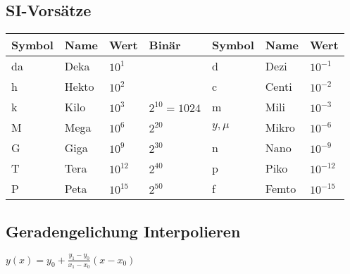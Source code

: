 \subsection{SI-Vorsätze}
\renewcommand{\arraystretch}{1.2}
\begin{tabularx}{\textwidth}{|X|X|X|X|X|X|l|}
	\hline
\textbf{Symbol}	&\textbf{Name}  &\textbf{Wert}  &\textbf{Binär}  &\textbf{Symbol}  &\textbf{Name}  &\textbf{Wert}
 \\ \hline 
da	& Deka    &$ 10^1 $   &    			     & d          & Dezi   &$ 10^{-1} $ 
\\ \hline
h	&Hekto    &$ 10^2 $   &                  & c          & Centi  &$ 10^{-2} $ 
\\ \hline
k	&Kilo     &$ 10^3 $   &$ 2^{10}=1024  $  & m          & Mili   &$ 10^{-3} $ 
\\ \hline
M	& Mega    &$ 10^6 $   &$ 2^20 $          &$ y, \mu $  & Mikro  &$ 10^{-6} $
\\ \hline
G   &Giga     &$ 10^9 $   &$ 2^30 $          & n          & Nano   &$ 10^{-9} $ 
\\ \hline
T	& Tera    &$ 10^{12} $&$ 2^{40} $        & p          & Piko   &$ 10^{-12} $
\\ \hline
P	&Peta	  &$ 10^{15} $&$ 2^{50} $	     & f          &	Femto  &$ 10^{-15} $
\\ \hline

\end{tabularx} 

\subsection{Geradengelichung Interpolieren}
$ y(x)=y_0 + \frac{y_1 - y_0}{x_1 - x_0}(x-x_0) $
\clearpage

